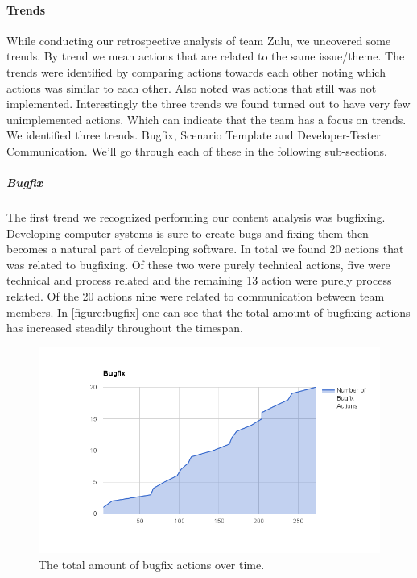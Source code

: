 \paragraph{Trends}
While conducting our retrospective analysis of team Zulu, we uncovered some trends. By trend we mean actions that are related to the same issue/theme. The trends were identified by comparing actions towards each other noting which actions was similar to each other. Also noted was actions that still was not implemented. Interestingly the three trends we found turned out to have very few unimplemented actions. Which can indicate that the team has a focus on trends. We identified three trends. Bugfix, Scenario Template and Developer-Tester Communication. We'll go through each of these in the following sub-sections. 

\subparagraph{Bugfix}
\label{section:bugfix}
The first trend we recognized performing our content analysis was bugfixing. Developing computer systems is sure to create bugs and fixing them then becomes a natural part of developing software. In total we found 20 actions that was related to bugfixing. Of these two were purely technical actions, five were technical and process related and the remaining 13 action were purely process related. Of the 20 actions nine were related to communication between team members. In \autoref{figure:bugfix} one can see that the total amount of bugfixing actions has increased steadily throughout the timespan. 

\begin{figure}[!h]
	\centering
	\includegraphics[width=\textwidth, keepaspectratio]{figures/bugfix.png}
	\caption{The total amount of bugfix actions over time.}
	\label{figure:bugfix}
\end{figure}

